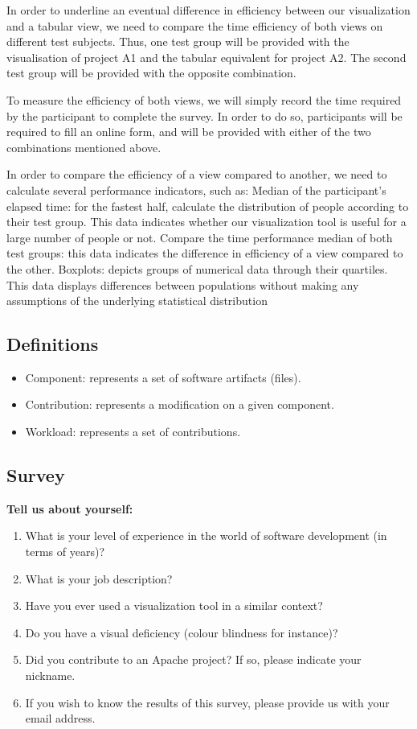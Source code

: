 In order to underline an eventual difference in efficiency between our visualization and a tabular view, we need to compare the time efficiency of both views on different test subjects. Thus, one test group will be provided with the visualisation of project A1 and the tabular equivalent for project A2. The second test group will be provided with the opposite combination.

To measure the efficiency of both views, we will simply record the time required by the participant to complete the survey. In order to do so, participants will be required to fill an online form, and will be provided with either of the two combinations mentioned above.

In order to compare the efficiency of a view compared to another, we need to calculate several performance indicators, such as:
Median of the participant’s elapsed time: for the fastest half, calculate the distribution of people according to their test group. This data indicates whether our visualization tool is useful for a large number of people or not.
Compare the time performance median of both test groups: this data indicates the difference in efficiency of a view compared to the other.
Boxplots: depicts groups of numerical data through their quartiles. This data displays differences between populations without making any assumptions of the underlying statistical distribution


\subsection{Definitions}
\begin{itemize}
\item Component: represents a set of software artifacts (files).
\item Contribution: represents a modification on a given component.
\item Workload: represents a set of contributions.
\end{itemize}

\subsection{Survey}

\textbf{Tell us about yourself:}
\begin{enumerate}
\item What is your level of experience in the world of software development (in terms of years)?
\item What is your job description?
\item Have you ever used a visualization tool in a similar context?
\item Do you have a visual deficiency (colour blindness for instance)?
\item Did you contribute to an Apache project? If so, please indicate your nickname.
\item If you wish to know the results of this survey, please provide us with your email address.
\end{enumerate}

